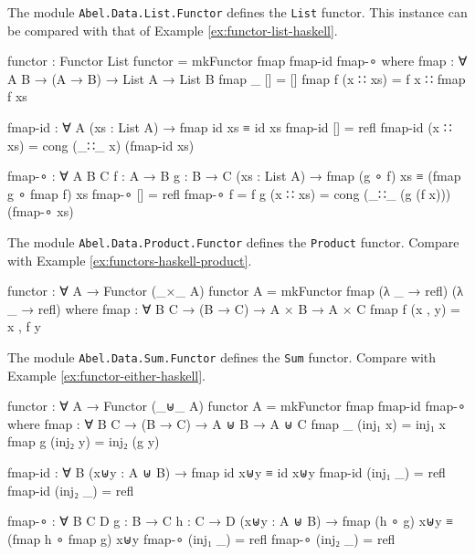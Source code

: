 \begin{example}
  \label{ex:functor-list-agda}
  The module \texttt{Abel.Data.List.Functor} defines the \texttt{List}
  functor. This instance can be compared with that of Example
  \ref{ex:functor-list-haskell}.
  \begin{codeagda}
    functor : Functor List
    functor = mkFunctor fmap fmap-id fmap-∘
      where
        fmap : ∀ {A B} → (A → B) → List A → List B
        fmap _ []       = []
        fmap f (x ∷ xs) = f x ∷ fmap f xs

        fmap-id : ∀ {A} (xs : List A) → fmap id xs ≡ id xs
        fmap-id []       = refl
        fmap-id (x ∷ xs) = cong (_∷_ x) (fmap-id xs)

        fmap-∘ : ∀ {A B C} {f : A → B} {g : B → C}
                 (xs : List A) → fmap (g ∘ f) xs ≡ (fmap g ∘ fmap f) xs
        fmap-∘             []       = refl
        fmap-∘ {f = f} {g} (x ∷ xs) = cong (_∷_ (g (f x))) (fmap-∘ xs)
    \end{codeagda}
\end{example}

\begin{example}
  \label{ex:functors-agda-product}
  The module \texttt{Abel.Data.Product.Functor} defines the
  \texttt{Product} functor. Compare with Example
  \ref{ex:functors-haskell-product}.
  \begin{codeagda}
    functor : ∀ {A} → Functor (_×_ A)
    functor {A} = mkFunctor fmap (λ _ → refl) (λ _ → refl)
      where
        fmap : ∀ {B C} → (B → C) → A × B → A × C
        fmap f (x , y) = x , f y
  \end{codeagda}
\end{example}

\begin{example}
  \label{ex:functors-agda-sum}
  The module \texttt{Abel.Data.Sum.Functor} defines the
  \texttt{Sum} functor. Compare with Example
  \ref{ex:functor-either-haskell}.
  \begin{codeagda}
    functor : ∀ {A} → Functor (_⊎_ A)
    functor {A} = mkFunctor fmap fmap-id fmap-∘
      where
        fmap : ∀ {B C} → (B → C) → A ⊎ B → A ⊎ C
        fmap _ (inj₁ x) = inj₁ x
        fmap g (inj₂ y) = inj₂ (g y)

        fmap-id : ∀ {B} (x⊎y : A ⊎ B) → fmap id x⊎y ≡ id x⊎y
        fmap-id (inj₁ _) = refl
        fmap-id (inj₂ _) = refl

        fmap-∘ : ∀ {B C D} {g : B → C} {h : C → D}
                 (x⊎y : A ⊎ B) → fmap (h ∘ g) x⊎y ≡ (fmap h ∘ fmap g) x⊎y
        fmap-∘ (inj₁ _) = refl
        fmap-∘ (inj₂ _) = refl
    \end{codeagda}
\end{example}

